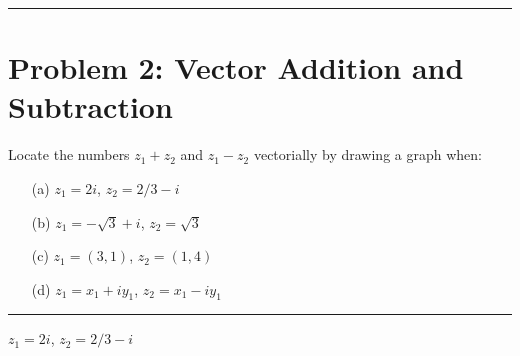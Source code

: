 \documentclass{article}
\begin{document}
\vspace{.5cm} %

\hrule %

\newpage
\section*{Problem 2: Vector Addition and Subtraction}
Locate the numbers $z_1+z_2$ and $z_1 - z_2$ vectorially by drawing a graph when:

\begin{enumerate}
    \item[(a)] $z_1 = 2i$, $z_2 = 2/3-i$
    
    \vspace{.5cm} %
    
    \item[(b)] $z_1 = -\sqrt{3}+i$, $z_2 = \sqrt{3}$
    
    \vspace{.5cm} %
    
    \item[(c)] $z_1 = (3,1)$, $z_2 = (1,4)$
    
    \vspace{.5cm} %
    
    \item[(d)] $z_1 = x_1+iy_1$, $z_2 = x_1-iy_1$
    
    \vspace{.5cm} %
\end{enumerate}
\hrule
\vspace{.5cm} %
$z_1 = 2i$, $z_2 = 2/3-i$
\end{document}
